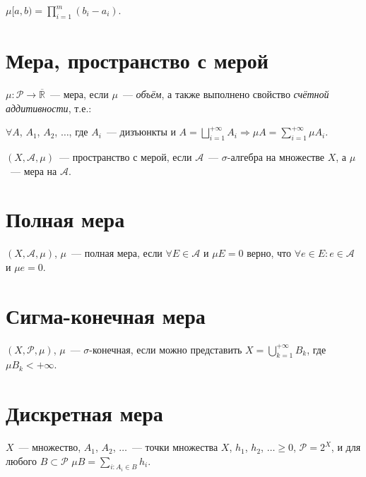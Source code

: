 \documentclass{article}
\begin{document}
        $\mu [a, b) = \prod\limits^m_{i = 1} (b_i - a_i)$.
        
    \newpage
    
    \section{Мера, пространство с мерой}
            
        $\mu : \mathcal{P} \rightarrow \overline{\mathbb{R}}$~--- мера, если $\mu$~--- \textit{объём}, а также выполнено свойство \textit{счётной аддитивности}, т.е.:
        
        $\forall A$, $A_1$, $A_2$, $\ldots$, где $A_i$~--- дизъюнкты и $A = \bigsqcup\limits^{+\infty}_{i = 1} A_i \Rightarrow \mu A = \sum\limits^{+\infty}_{i = 1} \mu A_i$.
        
        $(X, \mathcal{A}, \mu)$~--- пространство с мерой, если $\mathcal{A}$~--- $\sigma$-алгебра на множестве $X$, а $\mu$~--- мера на $\mathcal{A}$.
        
    \newpage
    
    \section{Полная мера}
    
        $(X, \mathcal{A}, \mu)$, $\mu$~--- полная мера, если $\forall E \in \mathcal{A}$ и $\mu E = 0$ верно, что $\forall e \in E : e \in \mathcal{A}$ и $\mu e = 0$.
        
    \newpage
    
    \section{Сигма-конечная мера}
    
        $(X, \mathcal{P}, \mu)$, $\mu$~--- $\sigma$-конечная, если можно представить $X = \bigcup\limits^{+\infty}_{k = 1} B_k$, где $\mu B_k < +\infty$.
        
    \newpage
    
    \section{Дискретная мера}
    
        $X$~--- множество, $A_1$, $A_2$, $\ldots$~--- точки множества $X$, $h_1$, $h_2$, $\ldots \geq 0$, $\mathcal{P} = 2^X$, и для любого $B \subset \mathcal{P}$ $\mu B = \sum\limits_{i : A_i \in B} h_i$.
        
\end{document}
